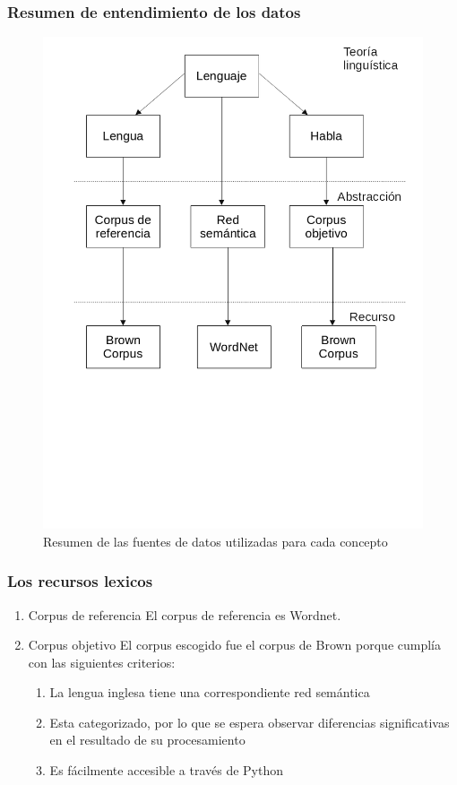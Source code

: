 \documentclass[twoside]{article}
\begin{document}
\subsubsection{Resumen de entendimiento de los datos}
\label{sec:org85cd851}
\begin{figure}[htbp]
\centering
\includegraphics[width=.9\linewidth]{./assets/entendimiento_de_los_datos.png}
\caption{Resumen de las fuentes de datos utilizadas para cada concepto}
\end{figure}


\subsubsection{Los recursos lexicos}
\label{sec:org514a008}


\begin{enumerate}
\item Corpus de referencia
\label{sec:orgfdfe466}
El corpus de referencia es Wordnet. 
\item Corpus objetivo
\label{sec:org1793e38}
El corpus escogido fue el corpus de Brown porque cumplía con las siguientes criterios:
\begin{enumerate}
\item La lengua inglesa tiene una correspondiente red semántica
\item Esta categorizado, por lo que se espera observar diferencias significativas en el resultado de su procesamiento
\item Es fácilmente accesible a través de Python
\end{enumerate}
\end{enumerate}
\end{document}
